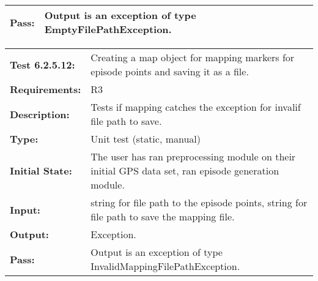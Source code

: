 \documentclass[12pt, titlepage]{article}
\begin{document}
{\begin{tabular}{|l|p{10cm}|}
    \bf{Pass}: & Output is an exception of type EmptyFilePathException. \\
    \hline
\end{tabular}
\begin{tabular}{|l|p{10cm}|}
    \hline
    \bf{Test} 6.2.5.12: & Creating a map object for mapping markers for episode points and saving it as a file.\\
    \bf{Requirements}: &  R3\\
    \bf{Description}: & Tests if mapping catches the exception for invalif file path to save. \\
    \bf{Type}: & Unit test (static, manual) \\
    \bf{Initial State}: & The user has ran preprocessing module on their initial GPS data set, ran episode generation module. \\
    \bf{Input}: & string for file path to the episode points, string for file path to save the mapping file. \\
    \bf{Output}: & Exception. \\
    \bf{Pass}: & Output is an exception of type InvalidMappingFilePathException. \\
    \hline
\end{tabular}
}
\end{document}
